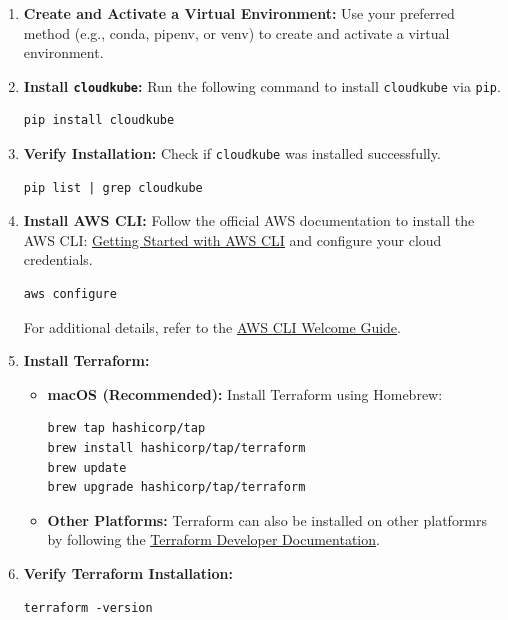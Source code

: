 \begin{enumerate}[leftmargin=20pt]
    \item \textbf{Create and Activate a Virtual Environment:}
          Use your preferred method (e.g., conda, pipenv, or venv) to create and activate a virtual environment.

    \item \textbf{Install \texttt{cloudkube}:}
          Run the following command to install \texttt{cloudkube} via \texttt{pip}.
          \begin{lstlisting}[xleftmargin=30pt]
pip install cloudkube
          \end{lstlisting}

    \item \textbf{Verify Installation:}
          Check if \texttt{cloudkube} was installed successfully.
          \begin{lstlisting}[xleftmargin=30pt]
pip list | grep cloudkube
          \end{lstlisting}

    \item \textbf{Install AWS CLI:}
          Follow the official AWS documentation to install the AWS CLI: 
          \href{https://docs.aws.amazon.com/cli/latest/userguide/getting-started-install.html}{\color{blue}\underline{Getting Started with AWS CLI}}
         and configure your cloud credentials.
          \begin{lstlisting}[xleftmargin=30pt]
aws configure
          \end{lstlisting}
          For additional details, refer to the 
          \href{https://docs.aws.amazon.com/cli/latest/userguide/cli-chap-welcome.html}{\color{blue}\underline{AWS CLI Welcome Guide}}.

    \item \textbf{Install Terraform:}
          \begin{itemize}[leftmargin=4pt]
              \item \textbf{macOS (Recommended):}
                    Install Terraform using Homebrew:
                    \begin{lstlisting}[xleftmargin=30pt]
brew tap hashicorp/tap
brew install hashicorp/tap/terraform
brew update
brew upgrade hashicorp/tap/terraform
                    \end{lstlisting}

              \item \textbf{Other Platforms:}
                    Terraform can also be installed on other platformrs by following the \href{https://developer.hashicorp.com/terraform/tutorials/aws-get-started/install-cli}{\color{blue}\underline{Terraform Developer Documentation}}.
          \end{itemize}

    \item \textbf{Verify Terraform Installation:}
          \begin{lstlisting}[xleftmargin=30pt]
terraform -version
          \end{lstlisting}
\end{enumerate}


